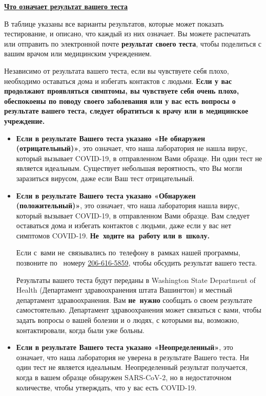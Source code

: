 \documentclass[10pt]{article}
\begin{document}
\large \underline{\textbf{Что означает результат вашего теста}}

В таблице указаны все варианты результатов, которые может показать тестирование,
и описано, что каждый из них означает. Вы можете распечатать или отправить по
электронной почте \textbf{результат своего теста}, чтобы поделиться с вашим
врачом или медицинским учреждением.

Независимо от результата вашего теста, если вы чувствуете себя плохо, необходимо
оставаться дома и избегать контактов с людьми. \textbf{Если у вас продолжают
проявляться симптомы, вы чувствуете себя очень плохо, обеспокоены по поводу
своего заболевания или у вас есть вопросы о результате вашего теста, следует
обратиться к врачу или в медицинское учреждение.}

\begin{itemize}


\item

  \textbf{Если в результате Вашего теста указано «Не обнаружен
  (отрицательный)»}, это означает, что наша лаборатория не нашла вирус, который
  вызывает COVID-19, в отправленном Вами образце. Ни один тест не является
  идеальным. Существует небольшая вероятность, что Вы могли заразиться вирусом,
  даже если Ваш тест отрицательный.

\item

  \textbf{Если в результате Вашего теста указано «Обнаружен (положительный)»},
  это означает, что наша лаборатория нашла вирус, который вызывает COVID-19, в
  отправленном Вами образце. Вам следует оставаться дома и избегать контактов с
  людьми, даже если у вас нет симптомов COVID-19. \textbf{Не ходите на работу
  или в школу.}

  Если с вами не связывались по телефону в рамках нашей программы, позвоните по 
  номеру \href{tel:+1-206-616-5859}{206-616-5859}, чтобы обсудить результат вашего теста.

  Результаты вашего теста будут переданы в Washington State Department of Health
  (Департамент здравоохранения штата Вашингтон) и местный департамент
  здравоохранения. Вам \textbf{не нужно} сообщать о своем результате
  самостоятельно. Департамент здравоохранения может связаться с вами, чтобы
  задать вопросы о вашей болезни и о людях, с которыми вы, возможно,
  контактировали, когда были уже больны.

\item

  \textbf{Если в результате Вашего теста указано «Неопределенный»}, это
  означает, что наша лаборатория не уверена в результате Вашего теста. Ни один
  тест не является идеальным. Неопределенный результат получается, когда в вашем
  образце обнаружен SARS-CoV-2, но в недостаточном количестве, чтобы утверждать,
  что у вас есть COVID-19.


\end{itemize}
\end{document}

